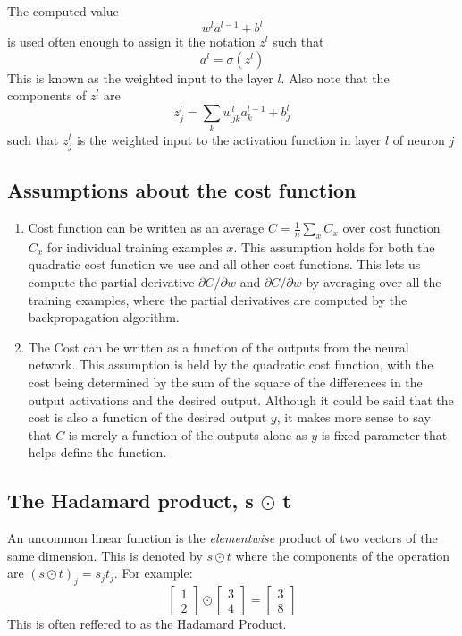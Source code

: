 \documentclass[a4paper,12pt]{article}
\begin{document}
The computed value $$w^la^{l-1}+b^l$$ is used often enough to assign it the notation $z^l$ such that $$a^l=\sigma (z^l)$$ This is known as the weighted input to the layer $l$. Also note that the components of $z^l$ are $$z^l_j=\sum_kw^l_{jk}a^{l-1}_k+b^l_j$$ such that $z^l_j$ is the weighted input to the activation function in layer $l$ of neuron $j$

\subsection{Assumptions about the cost function}
\begin{enumerate}
	\item Cost function can be written as an average $C = \frac{1}{n}\sum_xC_x$ over cost function $C_x$ for individual training examples $x$. This assumption holds for both the quadratic cost function we use and all other cost functions.
		This lets us compute the partial derivative $\partial C/\partial w$ and $\partial C/\partial w$ by averaging over all the training examples, where the partial derivatives are computed by the backpropagation algorithm.
	\item The Cost can be written as a function of the outputs from the neural network. This assumption is held by the quadratic cost function, with the cost being determined by the sum of the square of the differences in the output activations and the desired output. Although it could be said that the cost is also a function of the desired output $y$, it makes more sense to say that $C$ is merely a function of the outputs alone as $y$ is fixed parameter that helps define the function.
\end{enumerate}

\subsection{The Hadamard product, s $\odot$ t}
An uncommon linear function is the \textit{elementwise} product of two vectors of the same dimension. This is denoted by $s\odot t$ where the components of the operation are $(s \odot t)_j=s_jt_j$. For example: $$\left[ \begin{array}{c}1\\2\end{array} \right] \odot \left[ \begin{array}{c}3\\4\end{array} \right] = \left[ \begin{array}{c}3\\8\end{array} \right] $$ This is often reffered to as the Hadamard Product.
\end{document}
